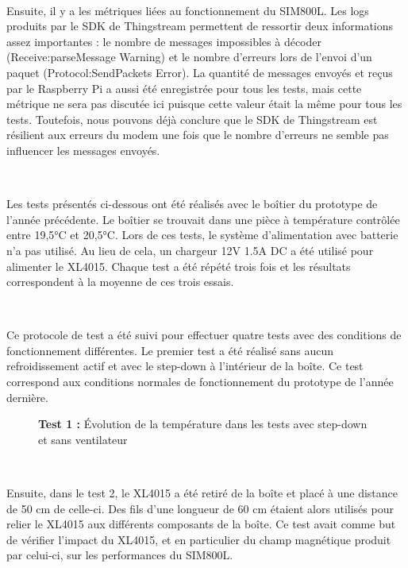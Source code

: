 ~

\noindent
Ensuite, il y a les métriques liées au fonctionnement du SIM800L.
Les logs produits par le SDK de Thingstream permettent de ressortir deux informations assez importantes : le nombre de messages impossibles à décoder (Receive:parseMessage Warning) et le nombre d’erreurs lors de l’envoi d’un paquet (Protocol:SendPackets Error). La quantité de messages envoyés et reçus par le Raspberry Pi a aussi été enregistrée pour tous les tests, mais cette métrique ne sera pas discutée ici puisque cette valeur était la même pour tous les tests. Toutefois, nous pouvons déjà conclure que le SDK de Thingstream est résilient aux erreurs du modem une fois que le nombre d’erreurs ne semble pas influencer les messages envoyés.

~


\noindent
Les tests présentés ci-dessous ont été réalisés avec le boîtier du prototype de l’année précédente. Le boîtier se trouvait dans une pièce à température contrôlée entre 19,5°C et 20,5°C. Lors de ces tests, le système d’alimentation avec batterie n’a pas utilisé. Au lieu de cela, un chargeur 12V 1.5A DC a été utilisé pour alimenter le XL4015. Chaque test a été répété trois fois et les résultats correspondent à la moyenne de ces trois essais.

~


\noindent
Ce protocole de test a été suivi pour effectuer quatre tests avec des conditions de fonctionnement différentes. Le premier test a été réalisé sans aucun refroidissement actif et avec le step-down à l’intérieur de la boîte. Ce test correspond aux conditions normales de fonctionnement du prototype de l’année dernière.



\begin{figure}[h!]
  \centering
  
  \label{fig:test_1}
  \vspace{-1cm}
  \caption{\textbf{Test 1 :} Évolution de la température dans les tests avec step-down et sans ventilateur}
\end{figure}

~

\noindent
Ensuite, dans le test 2, le XL4015 a été retiré de la boîte et placé à une distance de 50 cm de celle-ci. Des fils d'une longueur de 60 cm étaient alors utilisés pour relier le XL4015 aux différents composants de la boîte. Ce test avait comme but de vérifier l’impact du XL4015, et en particulier du champ magnétique produit par celui-ci, sur les performances du SIM800L.

